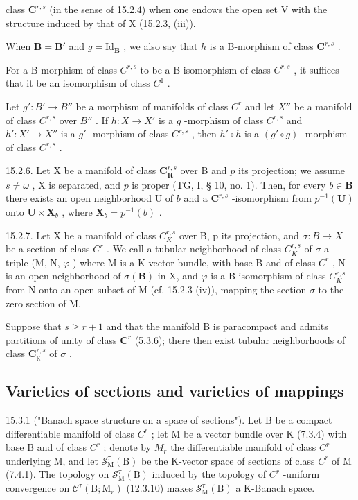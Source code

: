 class \(\mathbf{C}^{r,s}\) (in the sense of 15.2.4) when one endows the open set V with the structure induced by that of X (15.2.3, (iii)).

When \(\mathbf{B} = \mathbf{B}'\) and \(g = \mathrm{Id}_{\mathbf{B}}\) , we also say that \(h\) is a B-morphism of class \(\mathbf{C}^{r,s}\) .

For a B-morphism of class \(C^{r,s}\) to be a B-isomorphism of class \(C^{r,s}\) , it suffices that it be an isomorphism of class \(C^{1}\) .

Let \(g': B' \to B''\) be a morphism of manifolds of class \(C^r\) and let \(X''\) be a manifold of class \(C^{r,s}\) over \(B''\) . If \(h: X \to X'\) is a \(g\) -morphism of class \(C^{r,s}\) and \(h': X' \to X''\) is a \(g'\) -morphism of class \(C^{r,s}\) , then \(h' \circ h\) is a \((g' \circ g)\) -morphism of class \(C^{r,s}\) .

15.2.6. Let X be a manifold of class \(\mathbf{C}_{\mathbf{R}}^{r,s}\) over B and \(p\) its projection; we assume \(s \neq \omega\) , X is separated, and \(p\) is proper (TG, I, § 10, no. 1). Then, for every \(b \in \mathbf{B}\) there exists an open neighborhood U of \(b\) and a \(\mathbf{C}^{r,s}\) -isomorphism from \(p^{-1}(\mathbf{U})\) onto \(\mathbf{U} \times \mathbf{X}_b\) , where \(\mathbf{X}_b = p^{-1}(b)\) .

15.2.7. Let X be a manifold of class \(C_{K}^{r,s}\) over B, p its projection, and \(\sigma: B \to X\) be a section of class \(C^{r}\) . We call a tubular neighborhood of class \(C_{K}^{r,s}\) of \(\sigma\) a triple (M, N, \(\varphi\) ) where M is a K-vector bundle, with base B and of class \(C^{r}\) , N is an open neighborhood of \(\sigma(\mathbf{B})\) in X, and \(\varphi\) is a B-isomorphism of class \(C_{K}^{r,s}\) from N onto an open subset of M (cf. 15.2.3 (iv)), mapping the section \(\sigma\) to the zero section of M.

Suppose that \(s \geqslant r + 1\) and that the manifold B is paracompact and admits partitions of unity of class \(\mathbf{C}^{r}\) (5.3.6); there then exist tubular neighborhoods of class \(\mathbf{C}_{\mathbb{K}}^{r,s}\) of \(\sigma\) .

\subsection{Varieties of sections and varieties of mappings}

15.3.1 ("Banach space structure on a space of sections"). Let B be a compact differentiable manifold of class \(C^{r}\) ; let M be a vector bundle over K (7.3.4) with base B and of class \(C^{r}\) ; denote by \(M_{r}\) the differentiable manifold of class \(C^{r}\) underlying M, and let \(\mathcal{S}_{\mathrm{M}}^{\tau}(\mathrm{B})\) be the K-vector space of sections of class \(C^{r}\) of M (7.4.1). The topology on \(\mathcal{S}_{\mathrm{M}}^{\tau}(\mathrm{B})\) induced by the topology of \(C^{r}\) -uniform convergence on \(\mathcal{C}^{\tau}(\mathrm{B};\mathrm{M}_{r})\) (12.3.10) makes \(\mathcal{S}_{\mathrm{M}}^{\tau}(\mathrm{B})\) a K-Banach space.

